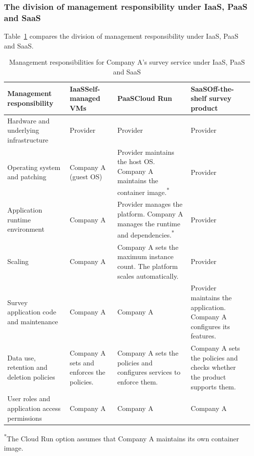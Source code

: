 \subsubsection{The division of management responsibility
under IaaS, PaaS and SaaS}

Table~\ref{tab:survey-management} compares
the division of management responsibility under IaaS, PaaS and SaaS.

\begin{table}[H]
\centering
\small
\begin{tabularx}{\textwidth}{
    @{}
    >{\raggedright\arraybackslash}p{}
    *{3}{>{\raggedright\arraybackslash}X}
    @{}
}
\toprule
\textbf{Management responsibility} &
\textbf{IaaS}\newline Self-managed VMs &
\textbf{PaaS}\newline Cloud Run &
\textbf{SaaS}\newline Off-the-shelf survey product \\
\midrule

Hardware and underlying infrastructure &
Provider &
Provider &
Provider \\

Operating system and patching &
Company A (guest OS) &
Provider maintains the host OS. Company A maintains the container image.\textsuperscript{*} &
Provider \\

Application runtime environment &
Company A &
Provider manages the platform. Company A manages the runtime and dependencies.\textsuperscript{*} &
Provider \\

Scaling &
Company A &
Company A sets the maximum instance count. The platform scales automatically. &
Provider \\

Survey application code and maintenance &
Company A &
Company A &
Provider maintains the application. Company A configures its features. \\

Data use, retention and deletion policies &
Company A sets and enforces the policies. &
Company A sets the policies and configures services to enforce them. &
Company A sets the policies and checks whether the product supports them. \\

User roles and application access permissions &
Company A &
Company A &
Company A \\

\bottomrule
\end{tabularx}
\caption{Management responsibilities for Company A's survey service under IaaS, PaaS and SaaS}
\label{tab:survey-management}

\par\smallskip
\begin{minipage}{\textwidth}
\footnotesize
\textsuperscript{*}The Cloud Run option assumes that Company A maintains its own container image.
\end{minipage}
\end{table}

